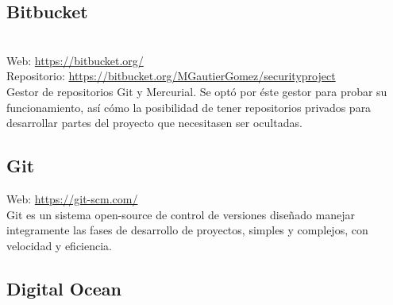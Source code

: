 \subsection{Bitbucket}

\\

Web: \url{https://bitbucket.org/}\\
Repositorio: \url{https://bitbucket.org/MGautierGomez/securityproject}\\

Gestor de repositorios Git y Mercurial. Se optó por éste gestor para probar su funcionamiento, así cómo la posibilidad de tener repositorios privados para desarrollar partes del proyecto que necesitasen ser ocultadas.\\

\subsection{Git}


Web: \url{https://git-scm.com/}\\

Git es un sistema open-source de control de versiones diseñado manejar integramente las fases de desarrollo de proyectos, simples y complejos, con velocidad y eficiencia.\\

\subsection{Digital Ocean}


